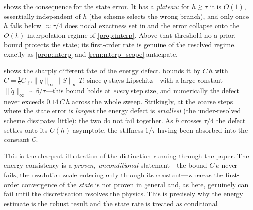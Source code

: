  shows the consequence for the state error. It
has a \emph{plateau}: for $h\gtrsim\tau$ it is $O(1)$, essentially independent
of $h$ (the scheme selects the wrong branch), and only once $h$ falls
below $\approx\tau/4$ does nodal exactness set in and the error collapse
onto the $O(h)$ interpolation regime of \cref{prop:interp}. Above that
threshold no a priori bound protects the state; its first-order rate is
genuine of the resolved regime, exactly as \cref{prop:interp} and
\cref{rem:interp_scope} anticipate.

 shows the sharply different fate of the energy
defect.  bounds it by $C\,h$ with
$C=\tfrac12 C_{\ell'}\|\dot q\|_\infty\|\dot S\|_\infty T$;
since $q$ stays Lipschitz---with a large constant
$\|\dot q\|_\infty\sim\beta/\tau$---this bound holds at \emph{every} step
size, and numerically the defect never exceeds $0.14\,C\,h$ across the
whole sweep. Strikingly, at the coarse steps where the state error is
\emph{largest} the energy defect is \emph{smallest} (the under-resolved
scheme dissipates little): the two do not fail together. As $h$ crosses
$\tau/4$ the defect settles onto its $O(h)$ asymptote, the stiffness
$1/\tau$ having been absorbed into the constant $C$.

This is the sharpest illustration of the distinction running through the
paper. The energy consistency is a \emph{proven, unconditional}
statement---the bound $C\,h$ never fails, the resolution scale entering
only through its constant---whereas the first-order convergence of the
\emph{state} is not proven in general and, as here, genuinely can fail
until the discretisation resolves the physics. This is precisely why the
energy estimate is the robust result and the state rate is treated as
conditional.

